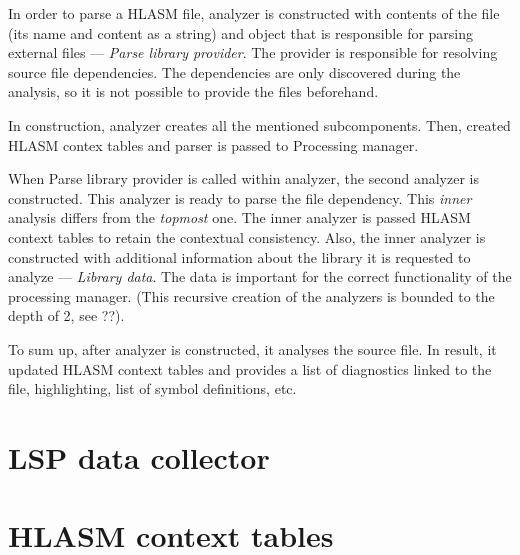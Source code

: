 In order to parse a HLASM file, analyzer is constructed with contents of the file (its name and content as a string) and object that is responsible for parsing external files --- \emph{Parse library provider}. The provider is responsible for resolving source file dependencies. The dependencies are only discovered during the analysis, so it is not possible to provide the files beforehand.

In construction, analyzer creates all the mentioned subcomponents. Then, created HLASM contex tables and parser is passed to Processing manager.

When Parse library provider is called within analyzer, the second analyzer is constructed. This analyzer is ready to parse the file dependency. This \emph{inner} analysis differs from the \emph{topmost} one. The inner analyzer is passed HLASM context tables to retain the contextual consistency. Also, the inner analyzer is constructed with additional information about the library it is requested to analyze --- \emph{Library data}. The data is important for the correct functionality of the processing manager. (This recursive creation of the analyzers is bounded to the depth of 2, see ??).

To sum up, after analyzer is constructed, it analyses the source file. In result, it updated HLASM context tables and provides a list of diagnostics linked to the file, highlighting, list of symbol definitions, etc.

\section{LSP data collector}

\section{HLASM context tables}



